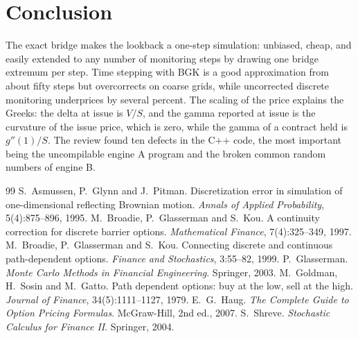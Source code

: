 \documentclass[11pt,a4paper]{article}
\theoremstyle{remark}
\begin{document}
\section{Conclusion}
The exact bridge makes the lookback a one-step simulation: unbiased, cheap, and easily extended to any number of monitoring
steps by drawing one bridge extremum per step. Time stepping with BGK is a good approximation from about fifty steps but
overcorrects on coarse grids, while uncorrected discrete monitoring underprices by several percent. The scaling of the price
explains the Greeks: the delta at issue is $V/S$, and the gamma reported at issue is the curvature of the issue price, which is
zero, while the gamma of a contract held is $g''(1)/S$. The review found ten defects in the C++ code, the most important being
the uncompilable engine A program and the broken common random numbers of engine B.

\begin{thebibliography}{99}\small
{} S.~Asmussen, P.~Glynn and J.~Pitman. Discretization error in simulation of one-dimensional reflecting Brownian
  motion. \emph{Annals of Applied Probability}, 5(4):875--896, 1995.
 M.~Broadie, P.~Glasserman and S.~Kou. A continuity correction for discrete barrier options.
  \emph{Mathematical Finance}, 7(4):325--349, 1997.
 M.~Broadie, P.~Glasserman and S.~Kou. Connecting discrete and continuous path-dependent options.
  \emph{Finance and Stochastics}, 3:55--82, 1999.
 P.~Glasserman. \emph{Monte Carlo Methods in Financial Engineering}. Springer, 2003.
 M.~Goldman, H.~Sosin and M.~Gatto. Path dependent options: buy at the low, sell at the high.
  \emph{Journal of Finance}, 34(5):1111--1127, 1979.
 E.~G.~Haug. \emph{The Complete Guide to Option Pricing Formulas}. McGraw-Hill, 2nd ed., 2007.
 S.~Shreve. \emph{Stochastic Calculus for Finance II}. Springer, 2004.
\end{thebibliography}
\end{document}
